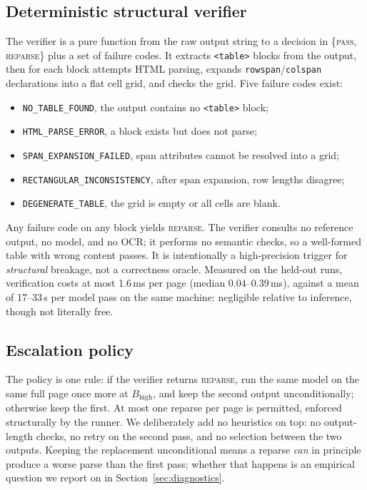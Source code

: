 \documentclass[conference]{IEEEtran}
\begin{document}
\subsection{Deterministic structural verifier}
\label{sec:verifier}

The verifier is a pure function from the raw output string to a decision
in \{\textsc{pass}, \textsc{reparse}\} plus a set of failure codes. It
extracts \texttt{<table>} blocks from the output, then for each block
attempts HTML parsing, expands \texttt{rowspan}/\texttt{colspan}
declarations into a flat cell grid, and checks the grid. Five failure
codes exist:

\begin{itemize}
  \item \texttt{NO\_TABLE\_FOUND}, the output contains no
  \texttt{<table>} block;
  \item \texttt{HTML\_PARSE\_ERROR}, a block exists but does not parse;
  \item \texttt{SPAN\_EXPANSION\_FAILED}, span attributes cannot be
  resolved into a grid;
  \item \texttt{RECTANGULAR\_INCONSISTENCY}, after span expansion, row
  lengths disagree;
  \item \texttt{DEGENERATE\_TABLE}, the grid is empty or all cells are
  blank.
\end{itemize}

Any failure code on any block yields \textsc{reparse}. The verifier
consults no reference output, no model, and no OCR; it performs no
semantic checks, so a well-formed table with wrong content passes. It is
intentionally a high-precision trigger for \emph{structural} breakage,
not a correctness oracle. Measured on the held-out runs, verification
costs at most 1.6\,ms per page (median 0.04--0.39\,ms), against a mean of
17--33\,s per model pass on the same machine: negligible relative to
inference, though not literally free.

\subsection{Escalation policy}
\label{sec:policy}

The policy is one rule: if the verifier returns \textsc{reparse}, run the
same model on the same full page once more at $B_{\mathrm{high}}$, and
keep the second output unconditionally; otherwise keep the first. At most
one reparse per page is permitted, enforced structurally by the runner.
We deliberately add no heuristics on top: no output-length checks, no
retry on the second pass, and no selection between the two outputs. Keeping
the replacement unconditional means a reparse \emph{can} in principle
produce a worse parse than the first pass; whether that happens is an
empirical question we report on in Section~\ref{sec:diagnostics}.
\end{document}
